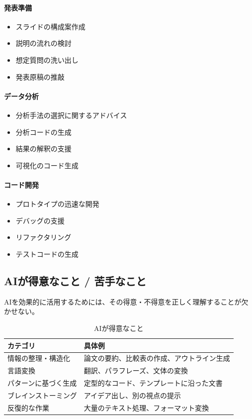 \paragraph{発表準備}
\begin{itemize}
\item スライドの構成案作成
\item 説明の流れの検討
\item 想定質問の洗い出し
\item 発表原稿の推敲
\end{itemize}

\paragraph{データ分析}
\begin{itemize}
\item 分析手法の選択に関するアドバイス
\item 分析コードの生成
\item 結果の解釈の支援
\item 可視化のコード生成
\end{itemize}

\paragraph{コード開発}
\begin{itemize}
\item プロトタイプの迅速な開発
\item デバッグの支援
\item リファクタリング
\item テストコードの生成
\end{itemize}

\subsection{AIが得意なこと / 苦手なこと}

AIを効果的に活用するためには、その得意・不得意を正しく理解することが欠かせない。

\begin{table}[htbp]
\centering
\caption{AIが得意なこと}
\label{tab:ai_strengths}
\begin{tabular}{ll}
\toprule
カテゴリ & 具体例 \\
\midrule
情報の整理・構造化 & 論文の要約、比較表の作成、アウトライン生成 \\
言語変換 & 翻訳、パラフレーズ、文体の変換 \\
パターンに基づく生成 & 定型的なコード、テンプレートに沿った文書 \\
ブレインストーミング & アイデア出し、別の視点の提示 \\
反復的な作業 & 大量のテキスト処理、フォーマット変換 \\
\bottomrule
\end{tabular}
\end{table}

